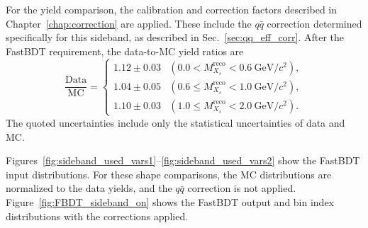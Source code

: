 For the yield comparison, the calibration and correction factors described in Chapter~\ref{chap:correction} are applied.
These include the $q\bar{q}$ correction determined specifically for this sideband, as described in Sec.~\ref{sec:qq_eff_corr}.
After the FastBDT requirement, the data-to-MC yield ratios are
\begin{equation}
\label{eq:mbc_sideband_ratio}
    \frac{\textrm{Data}}{\textrm{MC}} =
    \begin{cases}
    1.12 \pm 0.03 &
    (0.0 < M_{X_{s}}^{\textrm{reco}} < 0.6~\textrm{GeV}/c^{2}), \\[10pt]
    1.04 \pm 0.05 &
    (0.6 \leq M_{X_{s}}^{\textrm{reco}} < 1.0~\textrm{GeV}/c^{2}), \\[10pt]
    1.10 \pm 0.03 &
    (1.0 \leq M_{X_{s}}^{\textrm{reco}} < 2.0~\textrm{GeV}/c^{2}).
    \end{cases}
\end{equation}
The quoted uncertainties include only the statistical uncertainties of data and MC.

Figures~\ref{fig:sideband_used_vars1}--\ref{fig:sideband_used_vars2} show the FastBDT input distributions.
For these shape comparisons, the MC distributions are normalized to the data yields, and the $q\bar{q}$ correction is not applied.
Figure~\ref{fig:FBDT_sideband_on} shows the FastBDT output and bin index distributions with the corrections applied.

